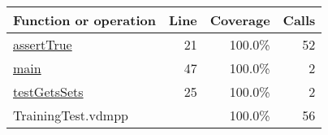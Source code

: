 \bigskip
\begin{longtable}{|l|r|r|r|}
\hline
Function or operation & Line & Coverage & Calls \\
\hline
\hline
\hyperref[assertTrue:21]{assertTrue} & 21&100.0\% & 52 \\
\hline
\hyperref[main:47]{main} & 47&100.0\% & 2 \\
\hline
\hyperref[testGetsSets:25]{testGetsSets} & 25&100.0\% & 2 \\
\hline
\hline
TrainingTest.vdmpp & & 100.0\% & 56 \\
\hline
\end{longtable}

